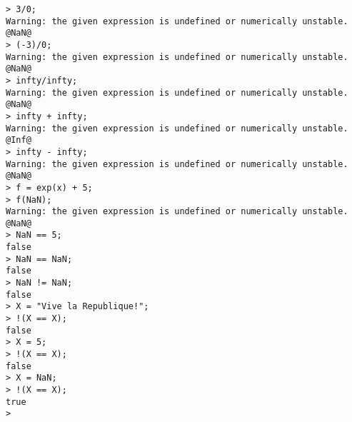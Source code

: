\begin{center}\begin{minipage}{15cm}\begin{Verbatim}[frame=single]
> 3/0;
Warning: the given expression is undefined or numerically unstable.
@NaN@
> (-3)/0;
Warning: the given expression is undefined or numerically unstable.
@NaN@
> infty/infty;
Warning: the given expression is undefined or numerically unstable.
@NaN@
> infty + infty;
Warning: the given expression is undefined or numerically unstable.
@Inf@
> infty - infty;
Warning: the given expression is undefined or numerically unstable.
@NaN@
> f = exp(x) + 5;
> f(NaN);
Warning: the given expression is undefined or numerically unstable.
@NaN@
> NaN == 5;
false
> NaN == NaN;
false
> NaN != NaN;
false
> X = "Vive la Republique!";
> !(X == X);
false
> X = 5;
> !(X == X);
false
> X = NaN;
> !(X == X);
true
> 
\end{Verbatim}
\end{minipage}\end{center}
